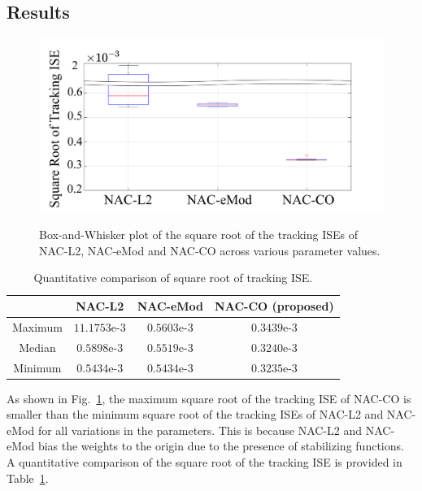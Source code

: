 \documentclass[letterpaper, 10 pt, conference]{ieeeconf}  %
\begin{document}
\subsection{Results}

\begin{figure}[!t]      
    \centering
    {\includegraphics[width=.85\linewidth]{BoxWhisker.drawio.png}}
\caption{Box-and-Whisker plot of the square root of the tracking ISEs of NAC-L2, NAC-eMod and NAC-CO across various parameter values.}
    \label{fig: Box-beard plot}
\end{figure}

\begin{table}[!t]
    \renewcommand{\arraystretch}{1.3}
    \caption{Quantitative comparison of square root of tracking ISE.}
    \centering
    \begin{tabular}{|c||c|c|c|}
    \hline
     & \textbf{NAC-L2} & \textbf{NAC-eMod} & \textbf{NAC-CO} (proposed) 
     \\
    \hline 
    Maximum         & $11.1753$e-3 & $0.5603$e-3 & $0.3439$e-3 \\
    \hline
    Median          & $0.5898$e-3 & $0.5519$e-3 & $0.3240$e-3 \\
    \hline
    Minimum         & $0.5434$e-3 & $0.5434$e-3 & $0.3235$e-3 \\
    \hline
    \end{tabular}
    \label{table: error norm}
\end{table}

As shown in Fig.~\ref{fig: Box-beard plot}, the maximum square root of the tracking ISE of NAC-CO is smaller than the minimum square root of the tracking ISEs of NAC-L2 and NAC-eMod for all variations in the parameters.
This is because NAC-L2 and NAC-eMod bias the weights to the origin due to the presence of stabilizing functions.
A quantitative comparison of the square root of the tracking ISE is provided in Table~\ref{table: error norm}.
\end{document}
